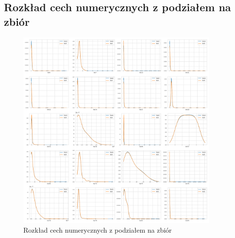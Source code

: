 \documentclass[a4paper,12pt]{article}
\begin{document}
    \newpage
    \begin{appendices}

        \section{Rozkład cech numerycznych z podziałem na zbiór}\label{appendix:rozklad-cech-numerycznych-zbiory}

        \begin{figure}[!h]
            \centering
            \includegraphics[width=0.9\textwidth]{../images/feature-distribution-0-20-train-test.png}
            \caption{Rozkład cech numerycznych z podziałem na zbiór}
        \end{figure}

        \newpage


\end{appendices}
\end{document}
